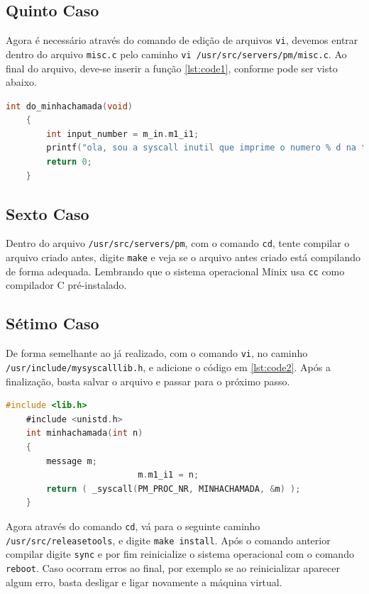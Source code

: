 \documentclass[12pt]{article}
\begin{document}
\subsection{Quinto Caso} \label{sec:5sec}
Agora é necessário através do comando de edição de arquivos \lstinline{vi}, devemos entrar dentro do arquivo \lstinline{misc.c} pelo caminho \lstinline{vi /usr/src/servers/pm/misc.c}.
Ao final do arquivo, deve-se inserir a função \ref{lst:code1}, conforme pode ser visto abaixo.

\begin{lstlisting}[caption={Programa em C que mostra o que faz a syscall}, label={lst:code1}, language=C]
     int do_minhachamada(void)
	{
		int input_number = m_in.m1_i1;
		printf("ola, sou a syscall inutil que imprime o numero % d na tela \n ", input_number);
		return 0;
	}
\end{lstlisting}

\subsection{Sexto Caso} \label{sec:6sec}

Dentro do arquivo \lstinline{/usr/src/servers/pm}, com o comando \lstinline{cd}, tente compilar o arquivo criado antes, digite \lstinline{make} e veja se o arquivo antes criado
está compilando de forma adequada. Lembrando que o sistema operacional Minix usa \lstinline{cc} como compilador C pré-instalado.

\subsection{Sétimo Caso} \label{sec:7sec}
De forma semelhante ao já realizado, com o comando \lstinline{vi}, no caminho \lstinline{/usr/include/mysyscalllib.h}, e adicione o código em \ref{lst:code2}. Após a finalização,
basta salvar o arquivo e passar para o próximo passo.

\begin{lstlisting}[caption={Programa em C para somar dois números}, label={lst:code2}, language=C]
    #include <lib.h>
	#include <unistd.h>
	int minhachamada(int n)
	{
		message m;
                          m.m1_i1 = n;
		return ( _syscall(PM_PROC_NR, MINHACHAMADA, &m) );
	}
\end{lstlisting}

Agora através do comando \lstinline{cd}, vá para o seguinte caminho \lstinline{/usr/src/releasetools}, e digite \lstinline{make install}. Após o comando anterior compilar
digite \lstinline{sync} e por fim reinicialize o sistema operacional com o comando \lstinline{reboot}. Caso ocorram erros ao final, por exemplo se ao reinicializar aparecer algum
erro, basta desligar e ligar novamente a máquina virtual.
\end{document}
